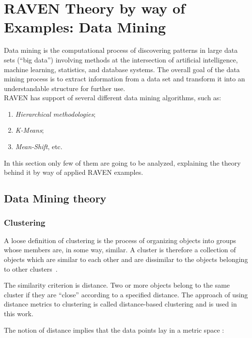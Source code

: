 \section{RAVEN Theory by way of Examples: Data Mining}

Data mining is the computational process of discovering patterns in large data sets (``big data'') involving methods at the intersection of artificial intelligence, machine learning, statistics, and database systems. The overall goal of the data mining process is to extract information from a data set and transform it into an understandable structure for further use. 
\\RAVEN has support of several different data mining algorithms, 
such as:
\begin{enumerate}
  \item \textit{Hierarchical methodologies};
  \item \textit{K-Means};
  \item \textit{Mean-Shift}, etc.
\end{enumerate}
In this section only few of them are going to be analyzed, explaining the theory behind it
by way of applied RAVEN examples.

\subsection{Data Mining theory}
\label{sec:dataMining}

\subsubsection{Clustering}
\label{clustering}
A loose definition of clustering is the process of organizing objects into groups whose members are, in some way, similar.
A cluster is therefore a collection of objects which are similar to each other and are dissimilar to the objects belonging to other clusters~\cite{SurveyClustering,MandelliClusteringRESS}.

The similarity criterion is distance. Two or more objects belong to the same cluster if they are ``close'' according to a specified distance. The approach of using distance metrics to clustering is called distance-based clustering and is used in this work.

The notion of distance implies that the data points lay in a metric space \cite{Mendelson75introduction}:

